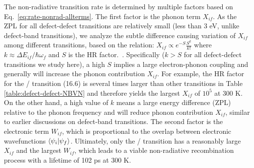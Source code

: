 The non-radiative transition rate is determined by multiple factors based on Eq.~\ref{eq:rate-nonrad-allterms}.
The first factor is the phonon term $X_{if}$. As the ZPL for all defect-defect transitions are relatively small (less than 3 eV, unlike defect-band transitions), we analyze the subtle difference causing variation of $X_{if}$ among different transitions, based on the relation:
$X_{if}\propto e^{-S}\frac{S^k}{k!}$ where $k\approx \Delta E_{if}/\hbar\omega_f$ and $S$ is the HR factor.~\cite{alkauskas2014first2}. Specifically ($k>S$ for all defect-defect transitions we study here), a high $S$ implies a large electron-phonon coupling and generally will increase the phonon contribution $X_{if}$.
For example, the HR factor for the / transition (16.6) is several times larger than other transitions in Table \ref{table:defect-defect-NBVN} and therefore yields the largest  $X_{if}$ of $10^5$ at 300 K.
On the other hand, a high value of $k$ means a large energy difference (ZPL) relative to the phonon frequency and will reduce phonon contribution $X_{if}$, similar to earlier discussions on defect-band transitions.
The second factor is the electronic term $W_{if}$, which is proportional to the overlap between electronic wavefunctions $\braket{\psi_i}{\psi_f}$.
Ultimately, only the / transition has a reasonably large $X_{if}$ and the largest $W_{if}$, which leads to a  viable non-radiative recombination process with a lifetime of 102 ps at 300 K.


